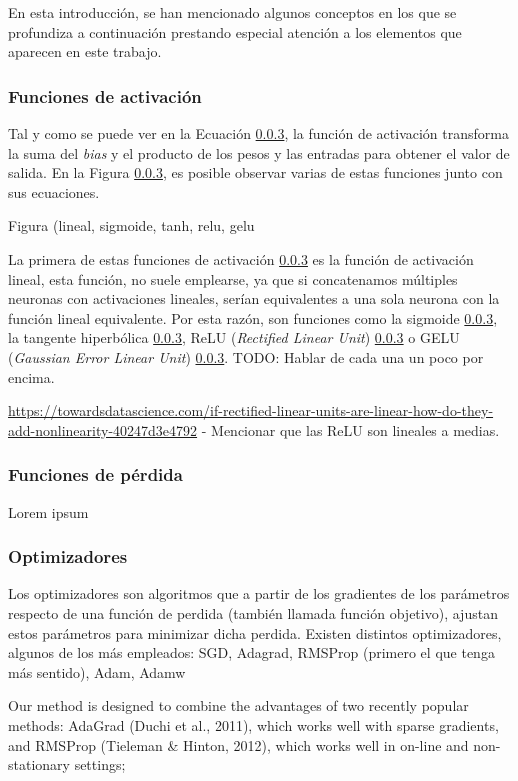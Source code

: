 
En esta introducción, se han mencionado algunos conceptos en los que se profundiza a continuación prestando especial atención a los elementos que aparecen en este trabajo.

\subsubsection{Funciones de activación}
Tal y como se puede ver en la Ecuación \ref{}, la función de activación transforma la suma del \textit{bias} y el producto de los pesos y las entradas para obtener el valor de salida. En la Figura \ref{}, es posible observar varias de estas funciones junto con sus ecuaciones.

Figura (lineal, sigmoide, tanh, relu, gelu

La primera de estas funciones de activación \ref{} es la función de activación lineal, esta función, no suele emplearse, ya que si concatenamos múltiples neuronas con activaciones lineales, serían equivalentes a una sola neurona con la función lineal equivalente. Por esta razón, son funciones como la sigmoide \ref{}, la tangente hiperbólica \ref{}, ReLU \cite{} (\textit{Rectified Linear Unit}) \ref{} o GELU \cite{} (\textit{Gaussian Error Linear Unit}) \ref{}. TODO: Hablar de cada una un poco por encima.

\url{https://towardsdatascience.com/if-rectified-linear-units-are-linear-how-do-they-add-nonlinearity-40247d3e4792} - Mencionar que las ReLU son lineales a medias.

\subsubsection{Funciones de pérdida}
Lorem ipsum

\subsubsection{Optimizadores}
Los optimizadores son algoritmos que a partir de los gradientes de los parámetros respecto de una función de perdida (también llamada función objetivo), ajustan estos parámetros para minimizar dicha perdida. Existen distintos optimizadores, algunos de los más empleados: SGD, Adagrad, RMSProp (primero el que tenga más sentido), Adam, Adamw

Our method is designed to combine the advantages of two recently popular methods: AdaGrad (Duchi et al., 2011), which works well with sparse gradients, and RMSProp (Tieleman \& Hinton, 2012), which works well in on-line and non-stationary settings;

